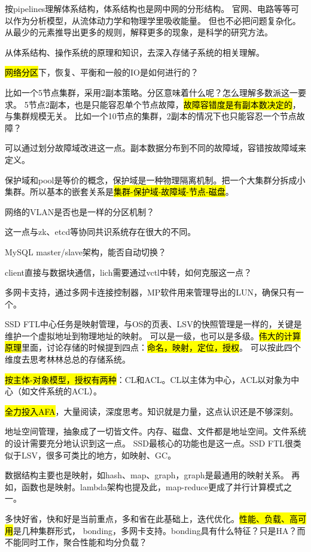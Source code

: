 按pipelines理解体系结构，体系结构也是网中网的分形结构。
官网、电路等等可以作为分析模型，从流体动力学和物理学里吸收能量。
但也不必把问题复杂化。从最少的元素推导出更多的规则，解释更多的现象，是科学的研究方法。

从体系结构、操作系统的原理和知识，去深入存储子系统的相关理解。

\hrulefill

\hl{网络分区}下，恢复、平衡和一般的IO是如何进行的？

比如一个5节点集群，采用2副本策略。分区意味着什么呢？怎么理解多数派这一要求。
5节点2副本，也是只能容忍单个节点故障，\hl{故障容错度是有副本数决定的}，与集群规模无关。
比如一个10节点的集群，2副本的情况下也只能容忍一个节点故障？

可以通过划分故障域改进这一点。副本数据分布到不同的故障域，容错按故障域来定义。

保护域和pool是等价的概念，保护域是一种物理隔离机制。把一个大集群分拆成小集群。所以基本的嵌套关系是\hl{集群-保护域-故障域-节点-磁盘}。

网络的VLAN是否也是一样的分区机制？

这一点与zk、etcd等协同共识系统存在很大的不同。

MySQL master/slave架构，能否自动切换？

\hrulefill

client直接与数据块通信，lich需要通过vctl中转，如何克服这一点？

多网卡支持，通过多网卡连接控制器，MP软件用来管理导出的LUN，确保只有一个。

SSD FTL中心任务是映射管理，与OS的页表、LSV的快照管理是一样的，关键是维护一个虚拟地址到物理地址的映射。
可以是一级，也可以是多级。\hl{伟大的计算原理}里面，讨论存储的时候提到四点：\hl{命名，映射，定位，授权}。
可以按此四个维度去思考林林总总的存储系统。

\hl{按主体-对象模型，授权有两种}：CL和ACL。CL以主体为中心，ACL以对象为中心（如文件系统的ACL）。

\hl{全力投入AFA}，大量阅读，深度思考。知识就是力量，这点认识还是不够深刻。

地址空间管理，抽象成了一切皆文件。内存、磁盘、文件都是地址空间。文件系统的设计需要充分地认识到这一点。
SSD最核心的功能也是这一点。SSD FTL很类似于LSV，很多可类比的地方，如映射、GC。

数据结构主要也是映射，如hash、map、graph，graph是最通用的映射关系。
再如，函数也是映射。lambda架构也提及此，map-reduce更成了并行计算模式之一。

\hrulefill

多快好省，快和好是当前重点，多和省在此基础上，迭代优化。\hl{性能、负载、高可用}是几种集群形式，
bonding，多网卡支持。bonding具有什么特征？只是HA？而不能同时工作，聚合性能和均分负载？


